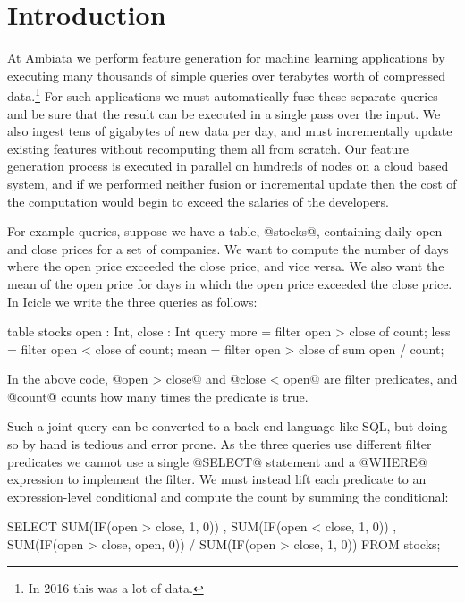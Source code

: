 \section{Introduction}
\label{icicle:s:Introduction}

At Ambiata we perform feature generation for machine learning applications by executing many thousands of simple queries over terabytes worth of compressed data.\footnote{In 2016 this was a lot of data.}
For such applications we must automatically fuse these separate queries and be sure that the result can be executed in a single pass over the input.
We also ingest tens of gigabytes of new data per day, and must incrementally update existing features without recomputing them all from scratch.
Our feature generation process is executed in parallel on hundreds of nodes on a cloud based system, and if we performed neither fusion or incremental update then the cost of the computation would begin to exceed the salaries of the developers.

For example queries, suppose we have a table, @stocks@, containing daily open and close prices for a set of companies. We want to compute the number of days where the open price exceeded the close price, and vice versa. We also want the mean of the open price for days in which the open price exceeded the close price. In Icicle we write the three queries as follows:

\begin{code}
table stocks { open : Int, close : Int }
query 
  more = filter open > close of count;
  less = filter open < close of count;
  mean = filter open > close of sum open / count;
\end{code}

In the above code, @open > close@ and @close < open@ are filter predicates, and @count@ counts how many times the predicate is true.

Such a joint query can be converted to a back-end language like SQL, but doing so by hand is tedious and error prone. As the three queries use different filter predicates we cannot use a single @SELECT@ statement and a @WHERE@ expression to implement the filter. We must instead lift each predicate to an expression-level conditional and compute the count by summing the conditional:
\begin{code}
  SELECT SUM(IF(open > close, 1,    0))
       , SUM(IF(open < close, 1,    0))
       , SUM(IF(open > close, open, 0))
       / SUM(IF(open > close, 1,    0))
  FROM stocks;
\end{code}

